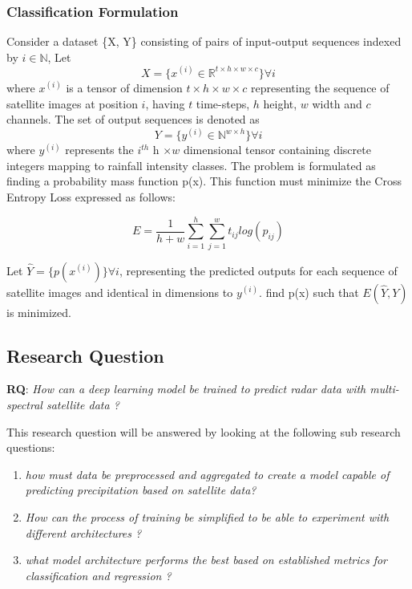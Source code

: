 \subsubsection[short]{Classification Formulation}
Consider a dataset \{X, Y\} consisting of pairs of input-output sequences indexed by $i \in \mathbb{N}$,
Let $$X = \{x^{(i)} \in \mathbb{R}^{t \times h \times w \times c}\} \forall i$$ 
where $x^{(i)}$ is a tensor of dimension $t \times h \times w \times c$ representing the sequence of satellite images at position $i$, having $t$ time-steps, $h$ height, $w$ width and $c$ channels.
The set of output sequences is denoted as $$Y = \{y^{(i)} \in \mathbb{N}^{w\times h}\}\forall i$$
where $y^{(i)}$ represents the $i^{th}$ h $\times w$ dimensional tensor containing discrete integers mapping to rainfall intensity classes.
The problem is formulated as finding a probability mass function p(x). This function must minimize the Cross Entropy Loss expressed as follows:

$$E = \frac{1}{h+w}\sum_{i=1}^h\sum_{j=1}^w t_{ij} log(p_{ij})$$

Let $\hat{Y} = \{p(x^{(i)})\}\forall i$, representing the predicted outputs for each sequence of satellite images and identical in dimensions to $y^{(i)}$.
find p(x) such that $E(\hat{Y}, Y)$ is minimized.

\subsection{Research Question}
\textbf{RQ}: \textit{How can a deep learning model be trained to predict radar data with multi-spectral satellite data ?}
\smallskip

This research question will be answered by looking at the following sub research questions:
\begin{enumerate}
    \item \textit{how must data be preprocessed and aggregated to create a model capable of predicting precipitation based on satellite data?}
    \item \textit{How can the process of training be simplified to be able to experiment with different architectures ?}
    \item \textit{what model architecture performs the best based on established metrics for classification and regression ?}
\end{enumerate}